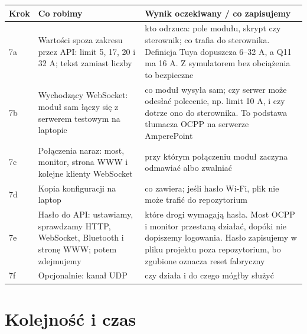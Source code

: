 \documentclass[11pt,a4paper]{article}
\begin{document}
\begin{longtable}{>{\raggedright\arraybackslash}p{3.00cm}>{\raggedright\arraybackslash}p{5.78cm}>{\raggedright\arraybackslash}p{6.50cm}}
\toprule
\rowcolor{apteallight}\textbf{Krok} & \textbf{Co robimy} & \textbf{Wynik oczekiwany / co zapisujemy} \\
\midrule\endhead
\bottomrule\endfoot
7a & Wartości spoza zakresu przez API: limit 5, 17, 20 i 32 A; tekst zamiast liczby & kto odrzuca: pole modułu, skrypt czy sterownik; co trafia do sterownika. Definicja Tuya dopuszcza 6–32 A, a Q11 ma 16 A. Z symulatorem bez obciążenia to bezpieczne \\
7b & Wychodzący WebSocket: moduł sam łączy się z serwerem testowym na laptopie & co moduł wysyła sam; czy serwer może odesłać polecenie, np. limit 10 A, i czy dotrze ono do sterownika. To podstawa tłumacza OCPP na serwerze AmperePoint \\
7c & Połączenia naraz: most, monitor, strona WWW i kolejne klienty WebSocket & przy którym połączeniu moduł zaczyna odmawiać albo zwalniać \\
7d & Kopia konfiguracji na laptop & co zawiera; jeśli hasło Wi-Fi, plik nie może trafić do repozytorium \\
7e & Hasło do API: ustawiamy, sprawdzamy HTTP, WebSocket, Bluetooth i stronę WWW; potem zdejmujemy & które drogi wymagają hasła. Most OCPP i monitor przestaną działać, dopóki nie dopiszemy logowania. Hasło zapisujemy w pliku projektu poza repozytorium, bo zgubione oznacza reset fabryczny \\
7f & Opcjonalnie: kanał UDP & czy działa i do czego mógłby służyć \\
\end{longtable}

\section{Kolejność i czas}
\end{document}
